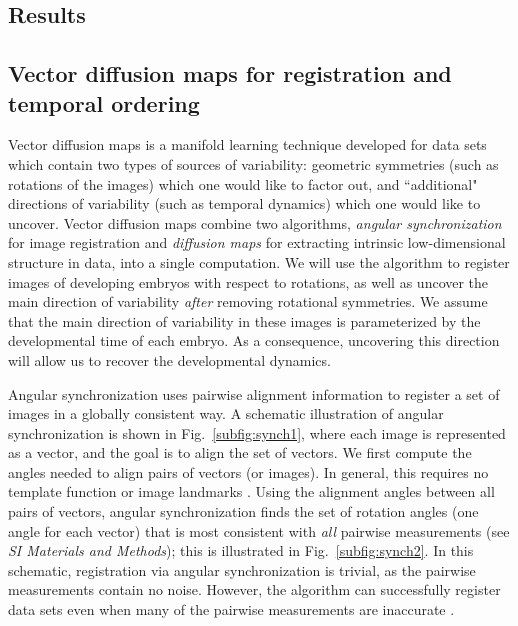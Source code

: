 \documentclass{pnastwo}
\newcommand{\SI}[0]{{\it SI Materials and Methods}}
\newcommand{\fig}[0]{Fig.}
\begin{document}
\begin{article}
\section{Results}

\subsection{Vector diffusion maps for registration and temporal ordering}

Vector diffusion maps \cite{singer2012vector} is a manifold learning
technique developed for data sets which contain two types of sources of variability:
geometric symmetries (such as rotations of the images) which one would like to factor out,
and ``additional" directions of variability (such as temporal dynamics) which one would like to uncover.
%
Vector diffusion maps combine two algorithms, {\em angular synchronization} \cite{singer2011angular} for image registration and {\em diffusion maps} \cite{coifman2005geometric} for extracting intrinsic low-dimensional structure in data, into a single computation.
%
We will use the algorithm to register images of developing embryos with respect to rotations, as well as uncover the main direction of variability {\it after} removing rotational symmetries.
%
We assume that the main direction of variability in these images is parameterized by the developmental time of each embryo.
%
As a consequence, uncovering this direction will allow us to recover the developmental dynamics.

Angular synchronization uses pairwise alignment information to register a set of images in a globally consistent way.
%
A schematic illustration of angular synchronization is shown in \fig~\ref{subfig:synch1}, where each image is represented as a vector, and the goal is to align the set of vectors.
%
We first compute the angles needed to align pairs of vectors (or images).  
%
In general, this requires no template function \cite{ahuja2007template} or image landmarks \cite{ian1998statistical}.
%
Using the alignment angles between all pairs of vectors, angular synchronization finds the set of rotation angles (one angle for each vector) that is most consistent with {\it all} pairwise measurements (see \SI); this is illustrated in \fig~\ref{subfig:synch2}.
%
In this schematic, registration via angular synchronization is trivial, as the pairwise measurements contain no noise.
%
However, the algorithm can successfully register data sets even when many of the pairwise measurements are inaccurate \cite{singer2011angular}.



\end{article}
\end{document}
